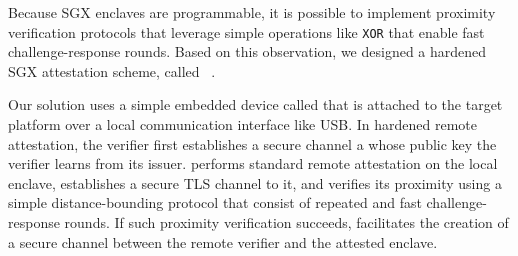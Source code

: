 Because SGX enclaves are programmable, it is possible to implement proximity verification protocols that leverage simple operations like \texttt{XOR} that enable fast challenge-response rounds. Based on this observation, we designed a hardened SGX attestation scheme, called \proximitee~\cite{proximitee}. %

Our solution uses a simple embedded device called \key that is attached to the target platform over a local communication interface like USB. In hardened remote attestation, the verifier first establishes a secure channel a \key whose public key the verifier learns from its issuer. \key performs standard remote attestation on the local enclave, establishes a secure TLS channel to it, and verifies its proximity using a simple distance-bounding protocol that consist of repeated and fast challenge-response rounds. If such proximity verification succeeds, \key facilitates the creation of a secure channel between the remote verifier and the attested enclave. 





